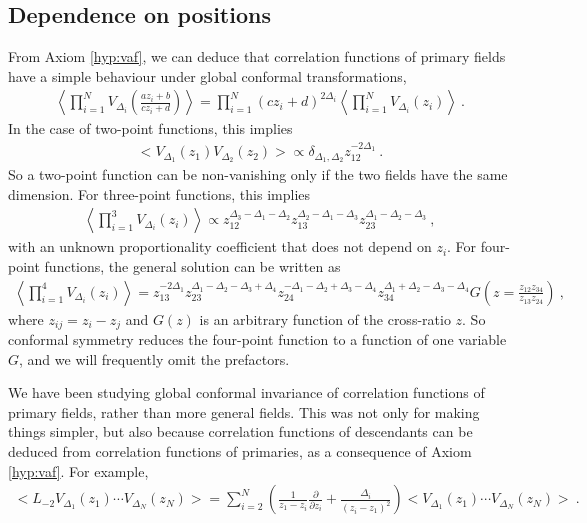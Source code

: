 \documentclass[12pt, a4paper]{article}
\theoremstyle{break}
\begin{document}
\subsection{Dependence on positions}

From Axiom \ref{hyp:vaf}, we can deduce that correlation functions of primary fields have a simple behaviour under global conformal transformations,
\begin{align}
 \left< \prod_{i=1}^N  V_{\Delta_i}\left(\frac{az_i+b}{cz_i+d}\right) \right>
 = \prod_{i=1}^N (cz_i +d)^{2\Delta_i} \left< \prod_{i=1}^N V_{\Delta_i}(z_i) \right>\ .
 \label{eq:zgc}
\end{align}
In the case of two-point functions, this implies
\begin{align}
 \Big< V_{\Delta_1}(z_1)V_{\Delta_2}(z_2) \Big> \propto \delta_{\Delta_1,\Delta_2} z_{12}^{-2\Delta_1} \ .
 \label{eq:2pt}
\end{align}
So a two-point function can be non-vanishing only if the two fields have the same dimension.
For three-point functions, this implies
\begin{align}
 \left< \prod_{i=1}^3 V_{\Delta_i}(z_i) \right> \propto z_{12}^{\Delta_3-\Delta_1-\Delta_2} z_{13}^{\Delta_2-\Delta_1-\Delta_3} z_{23}^{\Delta_1-\Delta_2-\Delta_3}\ ,
 \label{eq:3pt}
\end{align}
with an unknown proportionality coefficient that does not depend on $z_i$.
For four-point functions, the general solution can be written as 
\begin{align}
 \left< \prod_{i=1}^4 V_{\Delta_i}(z_i) \right> 
 = z_{13}^{-2\Delta_1} z_{23}^{\Delta_1-\Delta_2-\Delta_3+\Delta_4} z_{24}^{-\Delta_1-\Delta_2+\Delta_3-\Delta_4} z_{34}^{\Delta_1+\Delta_2-\Delta_3-\Delta_4} G\left(z=\frac{z_{12}z_{34}}{z_{13}z_{24}}\right)\ ,
 \label{eq:4pt}
\end{align}
where $z_{ij} = z_i - z_j$ and $G(z)$ is an arbitrary function of the cross-ratio $z$. 
So conformal symmetry reduces the four-point function to a function of one variable $G$, and we will frequently omit the prefactors.

We have been studying global conformal invariance of correlation functions of primary fields, rather than more general fields. This was not only for making things simpler, but also because correlation functions of descendants can be deduced from correlation functions of primaries, as a consequence of Axiom \ref{hyp:vaf}. For example,
\begin{align}
 \Big< L_{-2}V_{\Delta_1}(z_1) \cdots V_{\Delta_N}(z_N) \Big>
  =\sum_{i=2}^N\left(\frac{1}{z_1-z_i}\frac{\partial}{\partial z_i} +\frac{\Delta_i}{(z_i-z_1)^2}\right)  \Big< V_{\Delta_1}(z_1) \cdots V_{\Delta_N}(z_N)\Big>\ .
  \label{eq:ltv}
\end{align}
\end{document}
